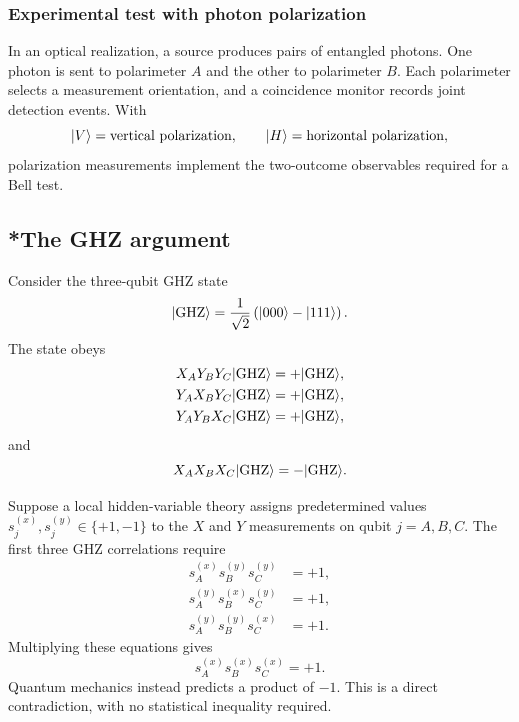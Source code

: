 \subsubsection{Experimental test with photon polarization}
In an optical realization, a source produces pairs of entangled photons. One
photon is sent to polarimeter $A$ and the other to polarimeter $B$. Each
polarimeter selects a measurement orientation, and a coincidence monitor
records joint detection events. With
\begin{equation}
 |{V}\rangle=\text{vertical polarization},
 \qquad |{H}\rangle=\text{horizontal polarization},
\end{equation}
polarization measurements implement the two-outcome observables required for
a Bell test.

\subsection{*The GHZ argument}

Consider the three-qubit GHZ state
\begin{equation}
 |{\mathrm{GHZ}}\rangle=\frac{1}{\sqrt2}\left(|{000}\rangle-|{111}\rangle\right).
\end{equation}
The state obeys
\begin{align}
 X_A Y_B Y_C|{\mathrm{GHZ}}\rangle&=+|{\mathrm{GHZ}}\rangle,\\
 Y_A X_B Y_C|{\mathrm{GHZ}}\rangle&=+|{\mathrm{GHZ}}\rangle,\\
 Y_A Y_B X_C|{\mathrm{GHZ}}\rangle&=+|{\mathrm{GHZ}}\rangle,
\end{align}
and
\begin{equation}
 X_A X_B X_C|{\mathrm{GHZ}}\rangle=-|{\mathrm{GHZ}}\rangle.
\end{equation}

Suppose a local hidden-variable theory assigns predetermined values
$s_j^{(x)},s_j^{(y)}\in\{+1,-1\}$ to the $X$ and $Y$ measurements on qubit
$j=A,B,C$. The first three GHZ correlations require
\begin{align}
 s_A^{(x)}s_B^{(y)}s_C^{(y)}&=+1,\\
 s_A^{(y)}s_B^{(x)}s_C^{(y)}&=+1,\\
 s_A^{(y)}s_B^{(y)}s_C^{(x)}&=+1.
\end{align}
Multiplying these equations gives
\begin{equation}
 s_A^{(x)}s_B^{(x)}s_C^{(x)}=+1.
\end{equation}
Quantum mechanics instead predicts a product of $-1$. This is a direct
contradiction, with no statistical inequality required.

